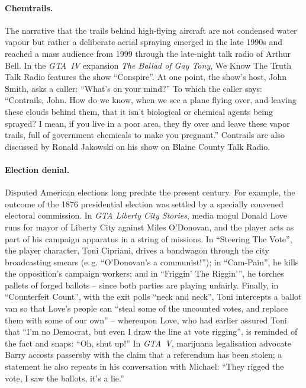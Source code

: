 \documentclass[]{scrartcl}
\begin{document}
\paragraph{Chemtrails.}
The narrative that the trails behind high-flying aircraft are not condensed water vapour but rather a deliberate aerial spraying emerged in the late 1990s and reached a mass audience from 1999 through the late-night talk radio of Arthur Bell.
In the \textit{GTA~IV} expansion \textit{The Ballad of Gay Tony}, We Know The Truth Talk Radio features the show \enquote{Conspire}.
At one point, the show's host, John Smith, asks a caller:
\enquote{What's on your mind?}
To which the caller says:
\enquote{Contrails, John.
How do we know, when we see a plane flying over, and leaving these clouds behind them, that it isn't biological or chemical agents being sprayed?
I mean, if you live in a poor area, they fly over and leave these vapor trails, full of government chemicals to make you pregnant.}
Contrails are also discussed by Ronald Jakowski on his show on Blaine County Talk Radio.

\paragraph{Election denial.}
Disputed American elections long predate the present century.
For example, the outcome of the 1876 presidential election was settled by a specially convened electoral commission.
In \textit{GTA Liberty City Stories}, media mogul Donald Love runs for mayor of Liberty City against Miles O'Donovan, and the player acts as part of his campaign apparatus in a string of missions.
In \enquote{Steering The Vote}, the player character, Toni Cipriani, drives a bandwagon through the city broadcasting smears (e.\,g. \enquote{O'Donovan's a communist!}); in \enquote{Cam-Pain}, he kills the opposition's campaign workers; and in \enquote{Friggin' The Riggin'}, he torches pallets of forged ballots -- since both parties are playing unfairly.
Finally, in \enquote{Counterfeit Count}, with the exit polls \enquote{neck and neck}, Toni intercepts a ballot van so that Love's people can \enquote{steal some of the uncounted votes, and replace them with some of our own} -- whereupon Love, who had earlier assured Toni that \enquote{I'm no Democrat, but even I draw the line at vote rigging}, is reminded of the fact and snaps: \enquote{Oh, shut up!}
In \textit{GTA~V}, marijuana legalisation advocate Barry accosts passersby with the claim that a referendum has been stolen; a statement he also repeats in his conversation with Michael:
\enquote{They rigged the vote, I saw the ballots, it's a lie.}
\end{document}
